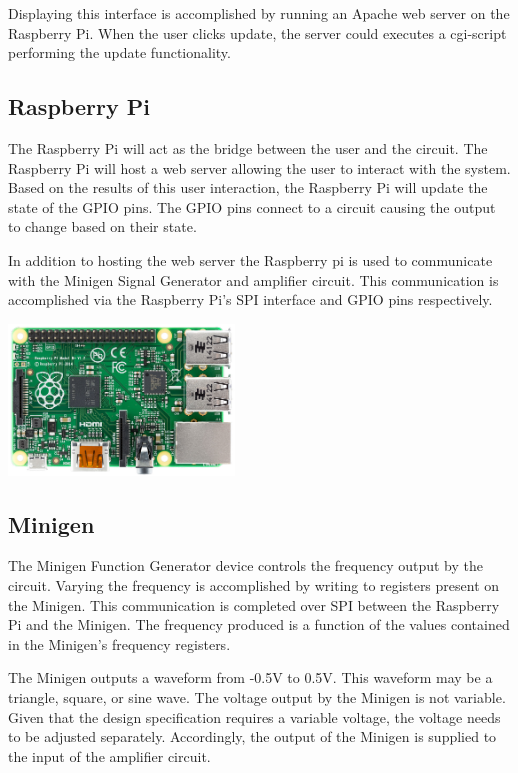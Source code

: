 \documentclass{article}	%
\begin{document}
\begin{multicols}{2}
Displaying this interface is accomplished by 
running an Apache web server on the Raspberry Pi. 
When the user clicks update, the server could executes 
a cgi-script performing the update functionality.

\subsection{Raspberry Pi}
The Raspberry Pi will act as the bridge between the user and the circuit.
The Raspberry Pi will host a web server allowing the user to interact with the system.
Based on the results of this user interaction, 
the Raspberry Pi will update the state of the GPIO pins.
The GPIO pins connect to a circuit causing the output to change based on their state. 

In addition to hosting the web server the Raspberry pi is used to
communicate with the 
Minigen Signal Generator and 
amplifier circuit.
This communication is accomplished via 
the Raspberry Pi's SPI interface and
GPIO pins respectively.


\begin{center}
\includegraphics[width=0.45\textwidth,keepaspectratio]{rpi_real.png}
\end{center}

\subsection{Minigen}
The Minigen Function Generator device controls the frequency output by the circuit.
Varying the frequency is accomplished 
by writing to registers present on the Minigen.
This communication is completed over SPI between
the Raspberry Pi and the Minigen.
The frequency produced is a function of
the values contained in the Minigen's frequency registers.

The Minigen outputs a waveform 
from -0.5V to 0.5V. 
This waveform may be a triangle, square, or sine wave.
The voltage output by the Minigen is not variable.
Given that the design specification requires a variable voltage,
the voltage needs to be adjusted separately.
Accordingly, the output of the Minigen 
is supplied to the input of the amplifier circuit.


\end{multicols}
\end{document}
